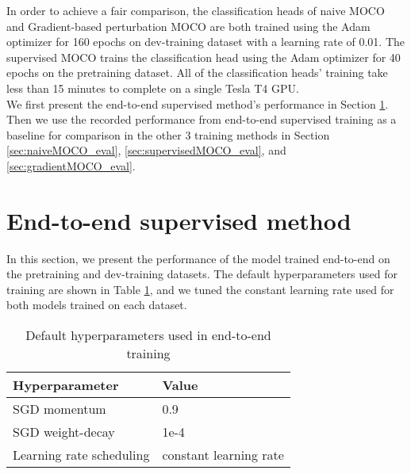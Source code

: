 \documentclass[12pt,twoside]{report}
\begin{document}
In order to achieve a fair comparison, the classification heads of naive MOCO and Gradient-based perturbation MOCO are both trained using the Adam optimizer for 160 epochs on dev-training dataset with a learning rate of 0.01. The supervised MOCO trains the classification head using the Adam optimizer for 40 epochs on the pretraining dataset. All of the classification heads' training take less than 15 minutes to complete on a single Tesla T4 GPU. \\

We first present the end-to-end supervised method's performance in Section \ref{sec:end2end}. Then we use the recorded performance from end-to-end supervised training as a baseline for comparison in the other 3 training methods in Section \ref{sec:naiveMOCO_eval}, \ref{sec:supervisedMOCO_eval}, and \ref{sec:gradientMOCO_eval}. 

\section{End-to-end supervised method} \label{sec:end2end}
In this section, we present the performance of the model trained end-to-end on the pretraining and dev-training datasets. The default hyperparameters used for training are shown in Table \ref{tab:supervised_hyperparameters}, and we tuned the constant learning rate used for both models trained on each dataset. \\

\begin{table}[]
    \centering
    \begin{tabular}{ll}
    \toprule
    Hyperparameter & Value \\
    \midrule
    SGD momentum & 0.9 \\
    SGD weight-decay & 1e-4 \\
    Learning rate scheduling & constant learning rate \\
    \bottomrule
    \end{tabular}
    \caption{Default hyperparameters used in end-to-end training}
    \label{tab:supervised_hyperparameters}
\end{table}
\end{document}
